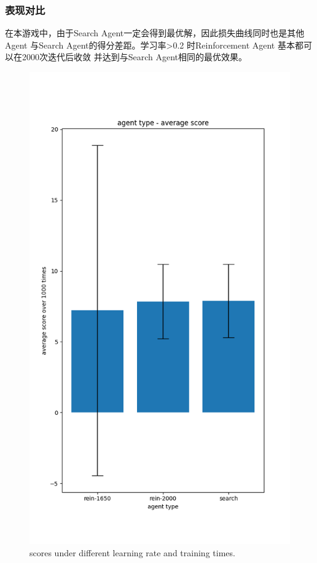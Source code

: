 \documentclass{article}
\begin{document}
\begin{CJK}{UTF8}{gbsn}
\subsubsection{表现对比}
在本游戏中，由于Search Agent一定会得到最优解，因此损失曲线同时也是其他Agent
与Search Agent的得分差距。学习率>0.2 时Reinforcement Agent 基本都可以在2000次迭代后收敛
并达到与Search Agent相同的最优效果。
\begin{figure}[htbp]
  \centering
  \includegraphics[scale = 0.3]{images/comp_rein_search.png}
  \caption{scores under different learning rate and training times.}
\end{figure} 


\end{CJK}
\end{document}
